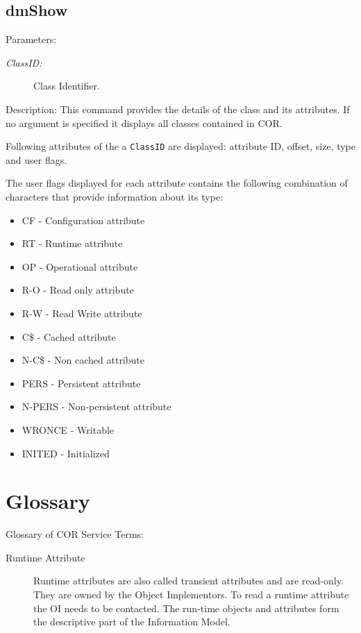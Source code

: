 \begin{flushleft}
\section{dmShow}
\begin{Desc}
\item
[Parameters:]
\begin{description} 
\item[{\em Class\-ID:}]Class Identifier.
\end{description}
\end{Desc}
\begin{Desc}
\item
[Description:]
This command provides the details of the class and its attributes. If no argument is specified it displays all classes contained in COR.
\par
Following attributes of the a {\tt{ClassID}} are displayed: attribute ID, offset, size, type and user flags. \par
The user flags displayed for each attribute 
contains the following combination of characters that provide information about its type:
\begin{itemize}
\item
CF 	- Configuration attribute
\item
RT	- Runtime attribute
\item
OP	- Operational attribute
\item
R-O	- Read only attribute 
\item
R-W	- Read Write attribute
\item
C\$	- Cached attribute
\item
N-C\$	- Non cached attribute
\item
PERS	- Persistent attribute
\item
N-PERS - Non-persistent attribute
\item
WRONCE - Writable
\item
INITED -  Initialized
\end{itemize}
\end{Desc}


\chapter*{Glossary}
\begin{Desc}
\item[Glossary of COR Service Terms:]
\begin{description}

\item[Runtime Attribute] Runtime attributes are also called transient attributes and are read-only. They are owned by the Object Implementors. To read a
runtime attribute the OI needs to be contacted. The run-time objects and attributes form the descriptive part of the Information Model.
\end{description}


\end{Desc}
\end{flushleft}
